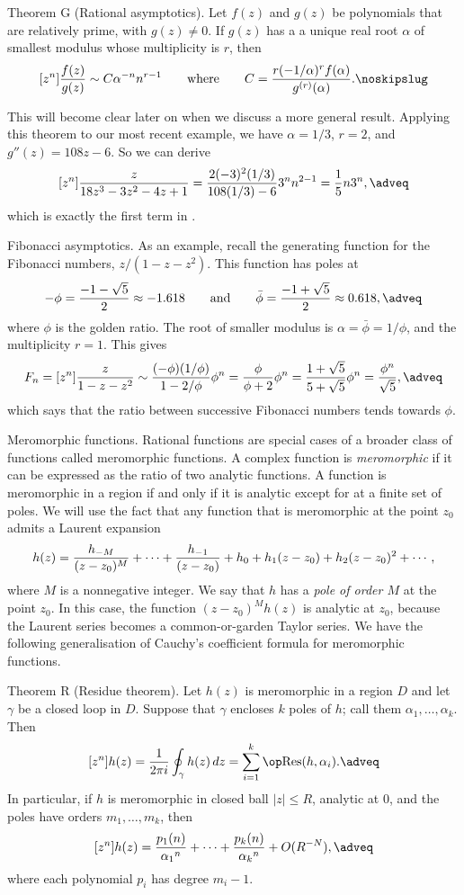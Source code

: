 \parenproclaim Theorem G (Rational asymptotics). Let $f(z)$ and $g(z)$ be polynomials that are relatively prime,
with $g(z) \neq 0$. If $g(z)$ has a a unique real root $\alpha$ of smallest modulus whose multiplicity is $r$, then
$$[z^n]{f(z)\over g(z)} \sim C\alpha^{-n} n^{r-1} \qquad\hbox{where}\qquad
   C = {r(-1/\alpha)^r f(\alpha) \over g^{(r)}(\alpha)}.\noskipslug$$

This will become clear later on when we discuss a more general result.
Applying this theorem to our most recent example, we have $\alpha = 1/3$, $r = 2$, and
$g''(z) = 108z-6$. So we can derive
$$[z^n]{z\over 18z^3 - 3z^2 - 4z + 1} = {2(-3)^2 (1/3) \over 108(1/3)-6} 3^n n^{2-1} = {1\over 5} n3^n,\adveq$$
which is exactly the first term in .
\medskip

\boldlabel Fibonacci asymptotics. As an example, recall the generating
function for the Fibonacci numbers, $z/(1-z-z^2)$. This function has poles at
$$-\phi = {-1-\sqrt 5\over 2}\approx -1.618 \qquad\hbox{and}\qquad
   \bar\phi = {-1+\sqrt 5\over 2}\approx0.618,\adveq$$
where $\phi$ is the golden ratio.
The root of smaller modulus is $\alpha = \bar\phi = 1/\phi$, and the multiplicity $r = 1$. This gives
$$F_n = [z^n]{z\over 1-z-z^2} \sim {(-\phi)(1/\phi)\over 1-2/\phi} \phi^n
    = {\phi \over \phi + 2}\phi^n = {1 + \sqrt 5 \over 5 + \sqrt 5}\phi^n = {\phi ^n\over \sqrt 5},\adveq$$
which says that the ratio between successive Fibonacci numbers tends towards $\phi$.
\medskip

\boldlabel Meromorphic functions. Rational functions are special cases of a broader class of functions
called meromorphic functions. A complex function is {\it meromorphic} if it can be expressed as the ratio
of two analytic functions. A function is meromorphic in a region if and only if it is analytic except for
at a finite set of poles.
We will use the fact that any function that is meromorphic at the point $z_0$
admits a Laurent expansion
$$h(z) = {h_{-M} \over (z-z_0)^M} + \cdots + {h_{-1}\over (z-z_0)} + h_0
    + h_1(z-z_0) + h_2(z-z_0)^2 + \cdots,$$
where $M$ is a nonnegative integer. We say that $h$ has a {\it pole of order $M$} at the point $z_0$.
In this case, the function $(z-z_0)^M h(z)$ is analytic at $z_0$, because the Laurent series becomes
a common-or-garden Taylor series. We have the following generalisation of Cauchy's coefficient formula
for meromorphic functions.

\parenproclaim Theorem R (Residue theorem). Let $h(z)$ is meromorphic in a region $D$ and let
$\gamma$ be a closed loop in $D$. Suppose that $\gamma$ encloses $k$ poles of $h$; call them
$\alpha_1,\ldots,\alpha_k$. Then
$$[z^n]h(z) = {1\over 2\pi i} \oint_\gamma h(z)\d z = \sum_{i=1}^k \Res(h, \alpha_i).\adveq$$
In particular, if $h$ is meromorphic in closed ball $|z|\leq R$, analytic at 0,
and the poles have orders $m_1,\ldots,m_k$, then
$$[z^n]h(z) = {p_1(n)\over {\alpha_1}^n} + \cdots + {p_k(n)\over {\alpha_k}^n} + O(R^{-N}),\adveq$$
where each polynomial $p_i$ has degree $m_i - 1$.\slug

